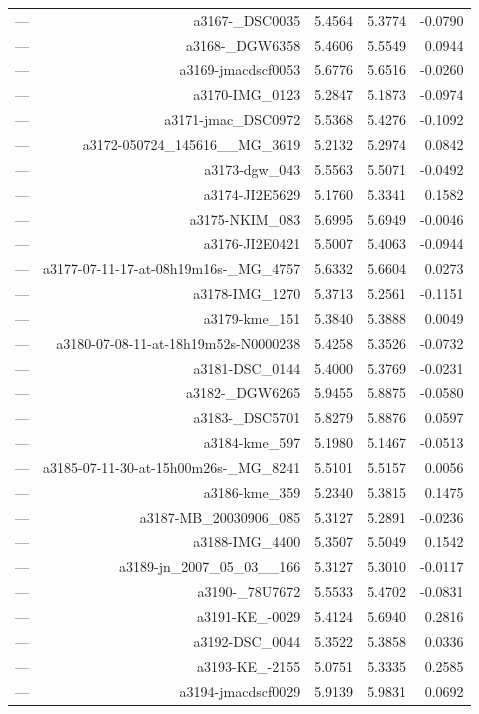 \begin{table}[htbp]
\begin{tabular}{lrrrr}
— & a3167-_DSC0035 & 5.4564 & 5.3774 & -0.0790 \\
— & a3168-_DGW6358 & 5.4606 & 5.5549 & 0.0944 \\
— & a3169-jmacdscf0053 & 5.6776 & 5.6516 & -0.0260 \\
— & a3170-IMG_0123 & 5.2847 & 5.1873 & -0.0974 \\
— & a3171-jmac_DSC0972 & 5.5368 & 5.4276 & -0.1092 \\
— & a3172-050724_145616__MG_3619 & 5.2132 & 5.2974 & 0.0842 \\
— & a3173-dgw_043 & 5.5563 & 5.5071 & -0.0492 \\
— & a3174-JI2E5629 & 5.1760 & 5.3341 & 0.1582 \\
— & a3175-NKIM_083 & 5.6995 & 5.6949 & -0.0046 \\
— & a3176-JI2E0421 & 5.5007 & 5.4063 & -0.0944 \\
— & a3177-07-11-17-at-08h19m16s-_MG_4757 & 5.6332 & 5.6604 & 0.0273 \\
— & a3178-IMG_1270 & 5.3713 & 5.2561 & -0.1151 \\
— & a3179-kme_151 & 5.3840 & 5.3888 & 0.0049 \\
— & a3180-07-08-11-at-18h19m52s-N0000238 & 5.4258 & 5.3526 & -0.0732 \\
— & a3181-DSC_0144 & 5.4000 & 5.3769 & -0.0231 \\
— & a3182-_DGW6265 & 5.9455 & 5.8875 & -0.0580 \\
— & a3183-_DSC5701 & 5.8279 & 5.8876 & 0.0597 \\
— & a3184-kme_597 & 5.1980 & 5.1467 & -0.0513 \\
— & a3185-07-11-30-at-15h00m26s-_MG_8241 & 5.5101 & 5.5157 & 0.0056 \\
— & a3186-kme_359 & 5.2340 & 5.3815 & 0.1475 \\
— & a3187-MB_20030906_085 & 5.3127 & 5.2891 & -0.0236 \\
— & a3188-IMG_4400 & 5.3507 & 5.5049 & 0.1542 \\
— & a3189-jn_2007_05_03__166 & 5.3127 & 5.3010 & -0.0117 \\
— & a3190-_78U7672 & 5.5533 & 5.4702 & -0.0831 \\
— & a3191-KE_-0029 & 5.4124 & 5.6940 & 0.2816 \\
— & a3192-DSC_0044 & 5.3522 & 5.3858 & 0.0336 \\
— & a3193-KE_-2155 & 5.0751 & 5.3335 & 0.2585 \\
— & a3194-jmacdscf0029 & 5.9139 & 5.9831 & 0.0692 \\

\end{tabular}
\end{table}
